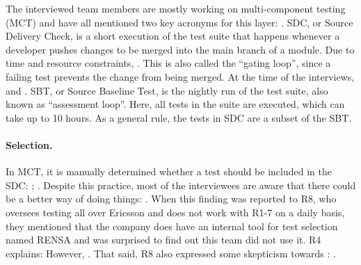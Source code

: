 The interviewed team members are mostly working on multi-component testing (MCT) and have all mentioned two key acronyms for this layer: .
SDC, or Source Delivery Check, is a short execution of the test suite that happens whenever a developer pushes changes to be merged into the main branch of a module.
Due to time and resource constraints, .
This is also called the ``gating loop'', since a failing test prevents the change from being merged.
At the time of the interviews,  and .
SBT, or Source Baseline Test, is the nightly run of the test suite, also known as ``assessment loop''.
Here, all tests in the suite are executed, which can take up to 10 hours.
As a general rule, the tests in SDC are a subset of the SBT.

\paragraph{Selection.} In MCT, it is manually determined whether a test should be included in the SDC: ; .
Despite this practice, most of the interviewees are aware that there could be a better way of doing things: .
When this finding was reported to R8, who oversees testing all over Ericsson and does not work with R1-7 on a daily basis, they mentioned that the company does have an internal tool for test selection named RENSA and was surprised to find out this team did not use it.
R4 explains:  
However, .
That said, R8 also expressed some skepticism towards \tcs: .

